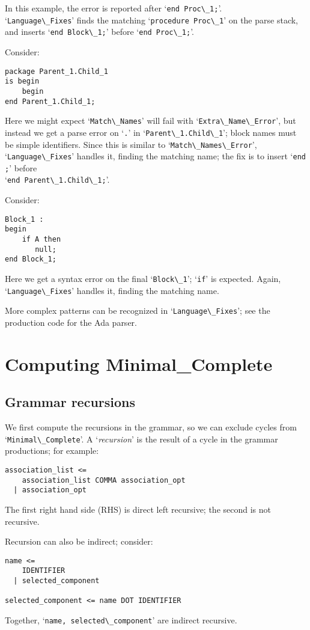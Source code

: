 \documentclass[authordraft]{acmart}
\newcommand{\code}[1]{`\lstinline|#1|'}
\begin{document}
In this example, the error is reported after \code{end Proc\_1;}.\\
\code{Language\_Fixes} finds the matching \code{procedure Proc\_1} on
the parse stack, and inserts \code{end Block\_1;} before
\code{end Proc\_1;}.

Consider:
\begin{lstlisting}
package Parent_1.Child_1
is begin
    begin
end Parent_1.Child_1;
\end{lstlisting}
Here we might expect \code{Match\_Names} will fail with
\code{Extra\_Name\_Error}, but instead we get a parse error on \code{.}
in \code{Parent\_1.Child\_1}; block names must be simple identifiers.
Since this is similar to \code{Match\_Names\_Error},
\code{Language\_Fixes} handles it, finding the matching name; the
fix is to insert \code{end ;} before\\ \code{end Parent\_1.Child\_1;}.

Consider:
\begin{lstlisting}
Block_1 :
begin
    if A then
       null;
end Block_1;
\end{lstlisting}
Here we get a syntax error on the final \code{Block\_1}; \code{if} is
expected. Again, \code{Language\_Fixes} handles it, finding the
matching name.

More complex patterns can be recognized in \code{Language\_Fixes}; see
the production code for the Ada parser.

\section{Computing Minimal\_Complete}
\label{minimal-complete-compute}

\subsection{Grammar recursions}
We first compute the recursions in the grammar, so we can exclude
cycles from \code{Minimal\_Complete}. A `{\it recursion}' is
the result of a cycle in the grammar productions; for example:
\begin{verbatim}
association_list <=
    association_list COMMA association_opt
  | association_opt
\end{verbatim}
The first right hand side (RHS) is direct left recursive; the second
is not recursive.

Recursion can also be indirect; consider:
\begin{verbatim}
name <=
    IDENTIFIER
  | selected_component

selected_component <= name DOT IDENTIFIER
\end{verbatim}
Together, \code{name, selected\_component} are indirect recursive.
\end{document}
